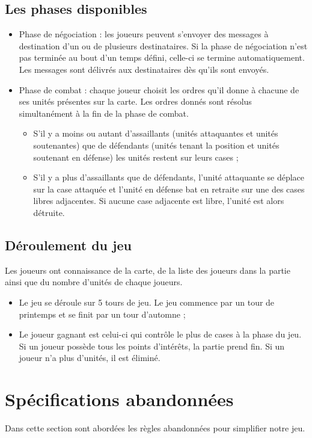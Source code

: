 	\subsection{Les phases disponibles}
		\begin{itemize}
			\item Phase de négociation : les joueurs peuvent s'envoyer des messages à destination d'un ou de plusieurs destinataires. Si la phase de négociation n'est pas terminée au bout d'un temps défini, celle-ci se termine automatiquement. Les messages sont délivrés aux destinataires dès qu'ils sont envoyés.
			\item Phase de combat : chaque joueur choisit les ordres qu'il donne à chacune de ses unités présentes sur la carte. Les ordres donnés sont résolus simultanément à la fin de la phase de combat.
			\begin{itemize}
				\item S'il y a moins ou autant d'assaillants (unités attaquantes et unités soutenantes) que de défendants (unités tenant la position et unités soutenant en défense) les unités restent sur leurs cases ;
				\item S'il y a plus d'assaillants que de défendants, l'unité attaquante se déplace sur la case attaquée et l'unité en défense bat en retraite sur une des cases libres adjacentes. Si aucune case adjacente est libre, l'unité est alors détruite.
			\end{itemize}
		\end{itemize}

	\subsection{Déroulement du jeu}
		Les joueurs ont connaissance de la carte, de la liste des joueurs dans la partie ainsi que du nombre d'unités de chaque joueurs.
		\begin{itemize}
			\item Le jeu se déroule sur 5 tours de jeu. Le jeu commence par un tour de printemps et se finit par un tour d'automne ;
			\item Le joueur gagnant est celui-ci qui contrôle le plus de cases à la phase du jeu. Si un joueur possède tous les points d'intérêts, la partie prend fin. Si un joueur n'a plus d'unités, il est éliminé.
		\end{itemize}

\section{Spécifications abandonnées}
	Dans cette section sont abordées les règles abandonnées pour simplifier notre jeu.

